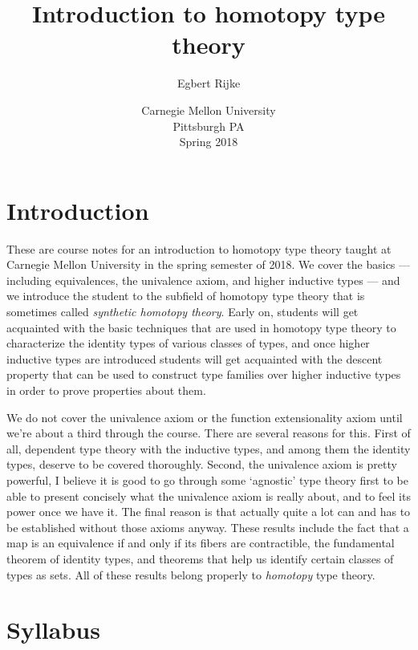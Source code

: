 \documentclass[11pt]{memoir} %
\title{Introduction to homotopy type theory}
\author{Egbert Rijke}
\date{Carnegie Mellon University\\Pittsburgh PA\\Spring 2018}
\begin{document}
\begin{titlingpage}
\maketitle 
\end{titlingpage}

\frontmatter
\tableofcontents

\chapter{Introduction}
These are course notes for an introduction to homotopy type theory taught at Carnegie Mellon University in the spring semester of 2018. We cover the basics --- including equivalences, the univalence axiom, and higher inductive types --- and we introduce the student to the subfield of homotopy type theory that is sometimes called \emph{synthetic homotopy theory}. Early on, students will get acquainted with the basic techniques that are used in homotopy type theory to characterize the identity types of various classes of types, and once higher inductive types are introduced students will get acquainted with the descent property that can be used to construct type families over higher inductive types in order to prove properties about them.

We do not cover the univalence axiom or the function extensionality axiom until we're about a third through the course. 
There are several reasons for this. 
First of all, dependent type theory with the inductive types, and among them the identity types, deserve to be covered thoroughly. 
Second, the univalence axiom is pretty powerful, I believe it is good to go through some `agnostic' type theory first to be able to present concisely what the univalence axiom is really about, and to feel its power once we have it. 
The final reason is that actually quite a lot can and has to be established without those axioms anyway. 
These results include the fact that a map is an equivalence if and only if its fibers are contractible, the fundamental theorem of identity types, and theorems that help us identify certain classes of types as sets.
All of these results belong properly to \emph{homotopy} type theory.

\chapter{Syllabus}

\mainmatter 
\end{document}
